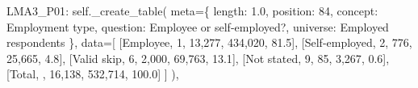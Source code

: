 \documentclass[
  11pt,
  a4paper,
]{article}
\newenvironment{Shaded}{\begin{snugshade}}{\end{snugshade}}
\newcommand{\NormalTok}[1]{\textcolor[rgb]{0.00,0.23,0.31}{#1}}
\newcommand{\OperatorTok}[1]{\textcolor[rgb]{0.37,0.37,0.37}{#1}}
\newcommand{\StringTok}[1]{\textcolor[rgb]{0.13,0.47,0.30}{#1}}
\newcommand{\VariableTok}[1]{\textcolor[rgb]{0.07,0.07,0.07}{#1}}
\begin{document}
\begin{Shaded}
\begin{Highlighting}[]
            \StringTok{\textquotesingle{}LMA3\_P01\textquotesingle{}}\NormalTok{: }\VariableTok{self}\NormalTok{.\_create\_table(}
\NormalTok{                meta}\OperatorTok{=}\NormalTok{\{}
                    \StringTok{\textquotesingle{}length\textquotesingle{}}\NormalTok{: }\StringTok{\textquotesingle{}1.0\textquotesingle{}}\NormalTok{, }\StringTok{\textquotesingle{}position\textquotesingle{}}\NormalTok{: }\StringTok{\textquotesingle{}84\textquotesingle{}}\NormalTok{,}
                    \StringTok{\textquotesingle{}concept\textquotesingle{}}\NormalTok{: }\StringTok{\textquotesingle{}Employment type\textquotesingle{}}\NormalTok{,}
                    \StringTok{\textquotesingle{}question\textquotesingle{}}\NormalTok{: }\StringTok{\textquotesingle{}Employee or self{-}employed?\textquotesingle{}}\NormalTok{,}
                    \StringTok{\textquotesingle{}universe\textquotesingle{}}\NormalTok{: }\StringTok{\textquotesingle{}Employed respondents\textquotesingle{}}
\NormalTok{                \},}
\NormalTok{                data}\OperatorTok{=}\NormalTok{[}
\NormalTok{                    [}\StringTok{\textquotesingle{}Employee\textquotesingle{}}\NormalTok{, }\StringTok{\textquotesingle{}1\textquotesingle{}}\NormalTok{, }\StringTok{\textquotesingle{}13,277\textquotesingle{}}\NormalTok{, }\StringTok{\textquotesingle{}434,020\textquotesingle{}}\NormalTok{, }\StringTok{\textquotesingle{}81.5\textquotesingle{}}\NormalTok{],}
\NormalTok{                    [}\StringTok{\textquotesingle{}Self{-}employed\textquotesingle{}}\NormalTok{, }\StringTok{\textquotesingle{}2\textquotesingle{}}\NormalTok{, }\StringTok{\textquotesingle{}776\textquotesingle{}}\NormalTok{, }\StringTok{\textquotesingle{}25,665\textquotesingle{}}\NormalTok{, }\StringTok{\textquotesingle{}4.8\textquotesingle{}}\NormalTok{],}
\NormalTok{                    [}\StringTok{\textquotesingle{}Valid skip\textquotesingle{}}\NormalTok{, }\StringTok{\textquotesingle{}6\textquotesingle{}}\NormalTok{, }\StringTok{\textquotesingle{}2,000\textquotesingle{}}\NormalTok{, }\StringTok{\textquotesingle{}69,763\textquotesingle{}}\NormalTok{, }\StringTok{\textquotesingle{}13.1\textquotesingle{}}\NormalTok{],}
\NormalTok{                    [}\StringTok{\textquotesingle{}Not stated\textquotesingle{}}\NormalTok{, }\StringTok{\textquotesingle{}9\textquotesingle{}}\NormalTok{, }\StringTok{\textquotesingle{}85\textquotesingle{}}\NormalTok{, }\StringTok{\textquotesingle{}3,267\textquotesingle{}}\NormalTok{, }\StringTok{\textquotesingle{}0.6\textquotesingle{}}\NormalTok{],}
\NormalTok{                    [}\StringTok{\textquotesingle{}Total\textquotesingle{}}\NormalTok{, }\StringTok{\textquotesingle{}\textquotesingle{}}\NormalTok{, }\StringTok{\textquotesingle{}16,138\textquotesingle{}}\NormalTok{, }\StringTok{\textquotesingle{}532,714\textquotesingle{}}\NormalTok{, }\StringTok{\textquotesingle{}100.0\textquotesingle{}}\NormalTok{]}
\NormalTok{                ]}
\NormalTok{            ),}
            

\end{Highlighting}
\end{Shaded}
\end{document}

